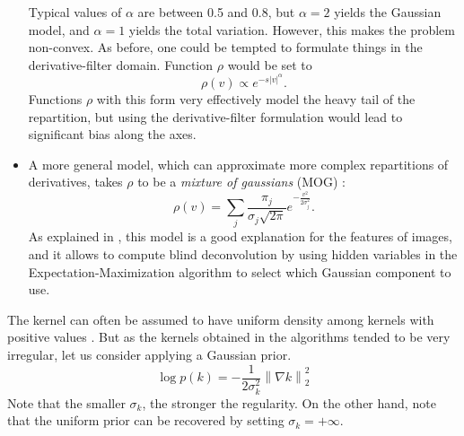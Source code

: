 \documentclass[english,a4paper]{article}
\theoremstyle{plain}
\theoremstyle{definition}
\theoremstyle{remark}
\newcommand{\norm}[1]{\left\lVert #1 \right\rVert}
\begin{document}
\begin{itemize}
	Typical values of $\alpha$ are between 0.5 and 0.8, but $\alpha=2$ yields the Gaussian model, and $\alpha=1$ yields the total variation.
	However, this makes the problem non-convex.
	As before, one could be tempted to formulate things in the derivative-filter domain. Function $\rho$ would be set to
	\begin{equation}\label{eq:rho_hyper_laplacian}
	\rho(v) \propto e^{-s|v|^\alpha}.
	\end{equation}
	Functions $\rho$ with this form very effectively model the heavy tail of the repartition, but using the derivative-filter formulation would lead to significant bias along the axes.
	\item A more general model, which can approximate more complex repartitions of derivatives, takes $\rho$ to be a \emph{mixture of gaussians} (MOG) \cite{fergus2006removing,levin2011efficient}:
	\begin{equation}\label{eq:rho_MOG}
	\rho(v) = \sum_j \frac{\pi_j}{\sigma_j\sqrt{2\pi}} e^{-\frac{v^2}{2\sigma_j^2}} .
	\end{equation}
	As explained in \cite{levin2011efficient}, this model is a good explanation for the features of images, and it allows to compute blind deconvolution by using hidden variables in the Expectation-Maximization algorithm to select which Gaussian component to use.
\end{itemize}


The kernel can often be assumed to have uniform density among kernels with positive values \cite{levi2009using}.
But as the kernels obtained in the algorithms tended to be very irregular, let us consider applying a Gaussian prior.
\begin{equation}\label{eq:p_k_gaussian}
\log p(k) = -\frac{1}{2\sigma_k^2}\norm{\nabla k}_2^2
\end{equation}
Note that the smaller $\sigma_k$, the stronger the regularity. On the other hand, note that the uniform prior can be recovered by setting $\sigma_k = +\infty$.
\end{document}
